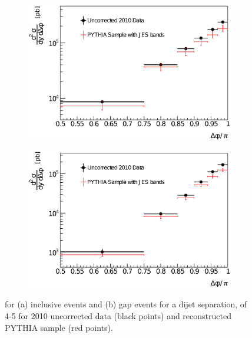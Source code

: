 \begin{figure}
\centering
        \begin{subfigure}[b]{0.5\textwidth}
                \centering
                \includegraphics[width=\textwidth]{figures/GBJ2/ControlPlots/Smeared__dPhi__4_5.eps}
        \end{subfigure}%
        \begin{subfigure}[b]{0.5\textwidth}
                \centering
                \includegraphics[width=\textwidth]{figures/GBJ2/ControlPlots/Smeared__dPhi_gap__4_5.eps}
        \end{subfigure}%
\caption[Comparison of the data and PYTHIA for \dphidyDist{} with $4<\dy{}<5$]{
\dphidyDist{} for (a) inclusive events and (b) gap events for a dijet separation, \dy{} of 4-5 for 2010 uncorrected data (black points) and reconstructed PYTHIA sample (red points).
\label{GBJ2:Uncorr:dphi45}}
\end{figure}



